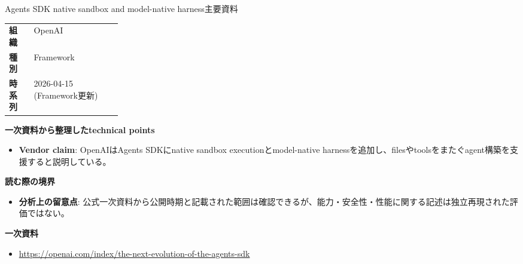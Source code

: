 \begin{technicalnote}{Agents SDK native sandbox and model-native harness}{主要資料}
\begingroup
\begin{tabularx}{\linewidth}{@{}>{\bfseries}p{0.22\linewidth}X@{}}
組織 & OpenAI \\
種別 & Framework \\
時系列 & 2026-04-15 (Framework更新) \\
\end{tabularx}
\smallskip
{\bfseries 一次資料から整理したtechnical points}
\begin{itemize}[leftmargin=1.5em,itemsep=0.35em]
\item \textbf{Vendor claim}: OpenAIはAgents SDKにnative sandbox executionとmodel-native harnessを追加し、filesやtoolsをまたぐagent構築を支援すると説明している。
\end{itemize}
{\bfseries 読む際の境界}
\begin{itemize}[leftmargin=1.5em,itemsep=0.35em]
\item \textbf{分析上の留意点}: 公式一次資料から公開時期と記載された範囲は確認できるが、能力・安全性・性能に関する記述は独立再現された評価ではない。
\end{itemize}
\begin{samepage}
{\bfseries 一次資料}
\begingroup\sloppy
\begin{itemize}[leftmargin=1.5em,itemsep=0.25em]
\item {\scriptsize\url{https://openai.com/index/the-next-evolution-of-the-agents-sdk}}
\end{itemize}
\endgroup
\end{samepage}
\endgroup
\end{technicalnote}
\medskip

